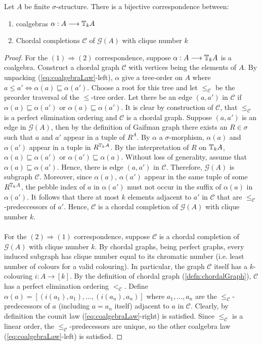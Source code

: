 \begin{prop}
Let $A$ be finite $\sigma$-structure. There is a bijective correspondence between:
\begin{enumerate}[label=(\arabic*)]
\item coalgebras $\alpha:A \longrightarrow {\mathbb{T}_{k}A}$
\item Chordal completions $\mathcal{C}$ of $\mathcal{G}(A)$ with clique number $k$
\end{enumerate}
\begin{proof}
For the $(1) \Rightarrow (2)$ correspondence, suppose $\alpha:A \longrightarrow {\mathbb{T}_{k}A}$ is a coalgebra. Construct a chordal graph $\mathcal{C}$ with vertices being the elements of $A$. By unpacking (\ref{eq:coalgebraLaw}-left), $\alpha$ give a tree-order on $A$ where $a \leq a' \Leftrightarrow \alpha(a) \sqsubseteq \alpha(a')$. Choose a root for this tree and let $\leq_{\mathcal{C}}$ be the preorder traversal of the $\leq$-tree order. Let there be an edge $(a,a')$ in $\mathcal{C}$ if $\alpha(a) \sqsubseteq \alpha(a')$ or $\alpha(a) \sqsubseteq \alpha(a')$.   
It is clear by construction of $\mathcal{C}$, that $\leq_{\mathcal{C}}$ is a perfect elimination ordering and $\mathcal{C}$ is a chordal graph. Suppose $(a,a')$ is an edge in $\mathcal{G}(A)$, then by the definition of Gaifman graph there exists an $R \in \sigma$ such that $a$ and $a'$ appear in a tuple of $R^{A}$. By $\alpha$ a $\sigma$-morphism, $\alpha(a)$ and $\alpha(a')$ appear in a tuple in $R^{{\mathbb{T}_{k}A}}$. By the interpretation of $R$ on ${\mathbb{T}_{k}A}$, $\alpha(a) \sqsubseteq \alpha(a')$ or $\alpha(a') \sqsubseteq \alpha(a)$. Without loss of generality, assume that $\alpha(a) \sqsubseteq \alpha(a')$. Hence, there is edge $(a,a')$ in $\mathcal{C}$. Therefore, $\mathcal{G}(A)$ is subgraph $\mathcal{C}$. Moreover, since $\alpha(a)$, $\alpha(a')$ appear in the same tuple of some $R^{{\mathbb{T}_{k}A}}$, the pebble index of $a$ in $\alpha(a')$ must not occur in the suffix of $\alpha(a)$ in $\alpha(a')$. It follows that there at most $k$ elements adjacent to $a'$ in $\mathcal{C}$ that are $\leq_{\mathcal{C}}$-predeccessors of $a'$. Hence, $\mathcal{C}$ is a chordal completion of $\mathcal{G}(A)$ with clique number $k$. \\~\\
For the $(2) \Rightarrow (1)$ correspondence, suppose $\mathcal{C}$ is a chordal completion of $\mathcal{G}(A)$ with clique number $k$. By chordal graphs, being perfect graphs, every induced subgraph has clique number equal to its chromatic number (i.e. least number of colours for a valid colouring). In particular, the graph $\mathcal{C}$ itself has a $k$-colouring $i:A \longrightarrow [k]$. By the definition of chordal graph (\ref{defn:chordalGraph}), $\mathcal{C}$ has a perfect elimination ordering $<_{\mathcal{C}}$. Define $\alpha(a) = [(i(a_{1}),a_{1}),\dots,(i(a_{n}),a_{n})]$ where $a_{1},\dots,a_{n}$ are the $\leq_{\mathcal{C}}$-predecessors of $a$ (including $a = a_{n}$ itself) adjacent to $a$ in $\mathcal{C}$. Clearly, by definition the counit law (\ref{eq:coalgebraLaw}-right) is satisfied. Since $\leq_{\mathcal{C}}$ is a linear order, the $\leq_{\mathcal{C}}$-predecessors are unique, so the other coalgebra law (\ref{eq:coalgebraLaw}-left) is satisfied.       

\end{proof}
\end{prop}
